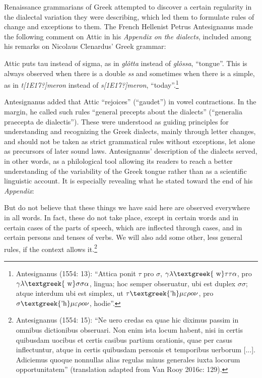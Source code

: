 \begin{styleStandard}
Renaissance grammarians of Greek attempted to discover a certain regularity in the dialectal variation they were describing, which led them to formulate rules of change and exceptions to them. The French Hellenist Petrus Antesignanus made the following comment on Attic in his \textit{Appendix on the dialects}, included among his remarks on Nicolaus Clenardus’ Greek grammar:
\end{styleStandard}

\begin{styleQuote}
Attic puts tau instead of sigma, as in \textit{glôtta} instead of \textit{glôssa}, “tongue”. This is always observed when there is a double \textit{ss} and sometimes when there is a simple, as in \textit{t[1E17?]meron} instead of \textit{s[1E17?]meron}, “today”.\footnote{\textrm{ Antesignanus (1554: 13): “Attica ponit $\tau $ pro $\sigma $, $\gamma \lambda \text{\textgreek{~w}}\tau \tau \alpha $, pro $\gamma \lambda \text{\textgreek{~w}}\sigma \sigma \alpha $, lingua; hoc semper obseruatur, ubi est duplex $\sigma \sigma $; atque interdum ubi est simplex, ut $\tau \text{\textgreek{'h}}\mu \varepsilon \rho o\nu $, pro $\sigma \text{\textgreek{'h}}\mu \varepsilon \rho o\nu $, hodie”.}}
\end{styleQuote}

\begin{styleStandard}
Antesignanus added that Attic “rejoices” (“gaudet”) in vowel contractions. In the margin, he called such rules “general precepts about the dialects” (“generalia praecepta de dialectis”). These were understood as guiding principles for understanding and recognizing the Greek dialects, mainly through letter changes, and should not be taken as strict grammatical rules without exceptions, let alone as precursors of later sound laws. Antesignanus’ description of the dialects served, in other words, as a philological tool allowing its readers to reach a better understanding of the variability of the Greek tongue rather than as a scientific linguistic account. It is especially revealing what he stated toward the end of his \textit{Appendix}:
\end{styleStandard}

\begin{styleQuote}
But do not believe that these things we have said here are observed everywhere in all words. In fact, these do not take place, except in certain words and in certain cases of the parts of speech, which are inflected through cases, and in certain persons and tenses of verbs. We will also add some other, less general rules, if the context allows it.\footnote{\textrm{ Antesignanus (1554: 15): “Ne uero credas ea quae hic diximus passim in omnibus dictionibus obseruari. Non enim ista locum habent, nisi in certis quibusdam uocibus et certis casibus partium orationis, quae per casus inflectuntur, atque in certis quibusdam personis et temporibus uerborum [...]. Adiciemus quoque nonnullas alias regulas minus generales iuxta locorum opportunitatem” (translation adapted from Van Rooy 2016c: 129).}}
\end{styleQuote}

